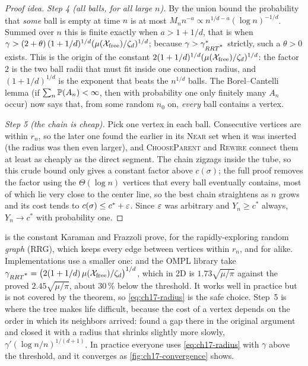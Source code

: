 \begin{proof}[Proof idea]
\emph{Step 4 (all balls, for all large $n$).} By the union bound the
probability that \emph{some} ball is empty at time $n$ is at most
$M_nn^{-a}\propto n^{1/d-a}(\log n)^{-1/d}$. Summed over $n$ this is finite
exactly when $a>1+1/d$, that is when
$\gamma>(2+\theta)\,(1+1/d)^{1/d}(\mu(\mathcal{X}_{\mathrm{free}})/\zeta_d)^{1/d}$; because
$\gamma>\gamma^*_{RRT\textsuperscript{*}}$ strictly, such a $\theta>0$ exists. This is
the origin of the constant $2(1+1/d)^{1/d}(\mu(\mathcal{X}_{\mathrm{free}})/\zeta_d)^{1/d}$: the
factor $2$ is the two ball radii that must fit inside one connection
radius, and $(1+1/d)^{1/d}$ is the exponent that beats the $n^{1/d}$
balls. The Borel--Cantelli lemma (if
$\sum_n\mathbb{P}(A_n)<\infty$, then with probability one only finitely many
$A_n$ occur) now says that, from some random $n_0$ on, \emph{every} ball
contains a vertex.

\emph{Step 5 (the chain is cheap).} Pick one vertex in each ball. Consecutive vertices are within $r_n$, so the
later one found the earlier in its \textsc{Near} set when it was inserted
(the radius was then even larger), and \textsc{ChooseParent} and
\textsc{Rewire} connect them at least as cheaply as the direct segment. The
chain zigzags inside the tube, so this crude bound only gives a constant
factor above $c(\sigma)$; the full proof removes the factor using the
$\Theta(\log n)$ vertices that every ball eventually contains, most of which
lie very close to the center line, so the best chain straightens as $n$
grows and its cost tends to $c(\sigma)\le c^*+\varepsilon$. Since $\varepsilon$ was
arbitrary and $Y_n\ge c^*$ always, $Y_n\to c^*$ with probability one.
\end{proof}

\begin{remark}
\label{rem:ch17-fineprint}
 is the constant Karaman and Frazzoli prove, for the
rapidly-exploring random \emph{graph} (RRG), which keeps every
edge between vertices within $r_n$, and for \rrtstar alike.
Implementations use a smaller one: \textcite{gammell2014informed} and the
OMPL library take
$\gamma_{RRT\textsuperscript{*}}=\bigl(2(1+1/d)\,\mu(\mathcal{X}_{\mathrm{free}})/\zeta_d\bigr)^{1/d}$, which
in 2D is $1.73\sqrt{\mu/\pi}$ against the proved $2.45\sqrt{\mu/\pi}$, about
$30\,\%$ below the threshold. It works well in practice but is not covered
by the theorem, so \cref{eq:ch17-radius} is the safe choice. Step~5 is where the tree makes life difficult, because the
cost of a vertex depends on the order in which its neighbors arrived:
\textcite{solovey2020revisiting} found a gap there in the original argument
and closed it with a radius that shrinks slightly more slowly,
$\gamma'(\log n/n)^{1/(d+1)}$. In practice everyone uses
\cref{eq:ch17-radius} with $\gamma$ above the threshold, and it converges as
\cref{fig:ch17-convergence} shows.
\end{remark}

